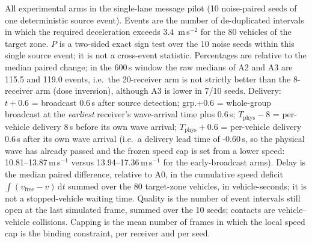\begin{table}[t]
\centering
\caption{All experimental arms in the single-lane message pilot (10 noise-paired seeds of one
deterministic source event). Events are the number of de-duplicated intervals in which the
required deceleration exceeds 3.4~m\,s$^{-2}$ for the 80 vehicles of the target zone.
$P$ is a two-sided exact sign test over the 10 noise seeds within this single source event;
it is not a cross-event statistic. Percentages are relative to the median paired change; in the
600\,s window the raw medians of A2 and A3 are 115.5 and 119.0 events, i.e.\ the 20-receiver arm is
not strictly better than the 8-receiver arm (dose inversion), although A3 is lower in 7/10 seeds. Delivery: $t+0.6$ = broadcast 0.6\,s after source detection;
grp.+0.6 = whole-group broadcast at the \emph{earliest} receiver's wave-arrival time plus 0.6\,s;
$T_{\mathrm{phys}}-8$ = per-vehicle delivery 8\,s before its own wave arrival;
$T_{\mathrm{phys}}+0.6$ = per-vehicle delivery 0.6\,s after its own wave arrival
(i.e.\ a delivery lead time of -0.60\,s, so the physical wave has already passed and the frozen
speed cap is set from a lower speed: 10.81--13.87\,m\,s$^{-1}$ versus 13.94--17.36\,m\,s$^{-1}$ for the early-broadcast arms).
Delay is the median paired difference, relative to A0, in the cumulative speed deficit
$\int (v_{\mathrm{free}} - v)\,\mathrm{d}t$ summed over the 80 target-zone vehicles,
in vehicle-seconds; it is not a stopped-vehicle waiting time.
Quality is the number of event intervals still open at the last simulated frame, summed over the
10 seeds; contacts are vehicle--vehicle collisions. Capping is the mean number of frames in which
the local speed cap is the binding constraint, per receiver and per seed.}
\label{tab:all_arms}
\footnotesize
\setlength{\tabcolsep}{2.6pt}


\end{table}
